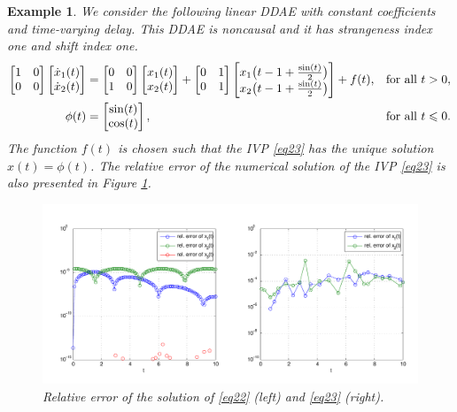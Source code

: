 \documentclass[final,reqno]{siamltex}
\renewenvironment{enumerate}[1]{\begin{compactenum}#1}{\end{compactenum}}
\newtheorem{example}[theorem]{Example}
\begin{document}
\begin{example} We consider the following linear DDAE with constant coefficients and time-varying delay. This DDAE 
is noncausal and it has strangeness index one and shift index one.
%
\begin{equation}\label{eq23}
\begin{aligned}
\m{
1&0\\
0&0 \\
}
\m{\dot{x}_1(t) \\ \dot{x}_2(t)} &=
\m{
0&0\\
1&0 \\
}
\m{x_1(t) \\ x_2(t)} + 
\m{
0&1\\
0&1
}
\m{x_1\bigl(t-1+\frac{\sin(t)}2\bigr) \\ x_2\bigl(t-1+\frac{\sin(t)}2\bigr)}
+f(t), && \mbox{for all } t>0,\\
\phi(t) &=
\m{
\sin(t)\\
\cos(t)
},
&& \mbox{for all } t \leq 0.
\end{aligned}
\end{equation}
The function $f(t)$ is chosen such that the IVP \eqref{eq23} has the unique solution $x(t)=\phi(t)$.
The relative error of the numerical solution of the IVP \eqref{eq23} is also presented in Figure \ref{fig_222}.
%
\begin{figure}[h!]
 \centering
 \includegraphics[width=\textwidth]{plot_222_varshifted.pdf}
 \caption{Relative error of the solution of \eqref{eq22} (left) and \eqref{eq23} (right).}
 \label{fig_222}
\end{figure}
\end{example}
%
\end{document}
